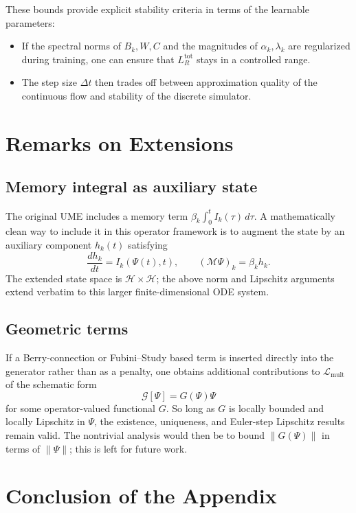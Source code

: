 \documentclass[11pt]{article}
\begin{document}
These bounds provide explicit stability criteria in terms of the learnable parameters:
\begin{itemize}[nosep]
\item If the spectral norms of \(B_k,W,C\) and the magnitudes of \(\alpha_k,\lambda_k\) are regularized during training, one can ensure that \(L_R^{\mathrm{tot}}\) stays in a controlled range.
\item The step size \(\Delta t\) then trades off between approximation quality of the continuous flow and stability of the discrete simulator.
\end{itemize}

\section{Remarks on Extensions}

\subsection{Memory integral as auxiliary state}

The original UME includes a memory term \(\beta_k \int_0^t I_k(\tau)\,d\tau\). A mathematically clean way to include it in this operator framework is to augment the state by an auxiliary component \(h_k(t)\) satisfying
\[
\frac{d h_k}{dt} = I_k(\Psi(t),t),
\qquad
(\mathcal{M}\Psi)_k = \beta_k h_k.
\]
The extended state space is \(\mathcal{H}\times\mathcal{H}\); the above norm and Lipschitz arguments extend verbatim to this larger finite-dimensional ODE system.

\subsection{Geometric terms}

If a Berry-connection or Fubini--Study based term is inserted directly into the generator rather than as a penalty, one obtains additional contributions to \(\mathcal{L}_{\mathrm{mult}}\) of the schematic form
\[
\mathcal{G}[\Psi] = G(\Psi)\Psi
\]
for some operator-valued functional \(G\). So long as \(G\) is locally bounded and locally Lipschitz in \(\Psi\), the existence, uniqueness, and Euler-step Lipschitz results remain valid. The nontrivial analysis would then be to bound \(\|G(\Psi)\|\) in terms of \(\|\Psi\|\); this is left for future work.

\section{Conclusion of the Appendix}
\end{document}
